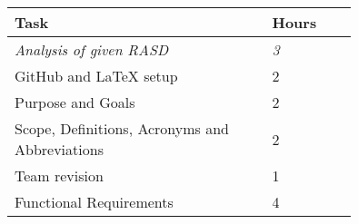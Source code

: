 \smallskip
\begin{center}
\begin{tabular}{ | p{0.75\linewidth} | l | }
  \hline
    \textbf{Task} & \textbf{Hours }\\ \hline
    \textit{Analysis of given RASD} & \textit{3} \\ \hline
    GitHub and LaTeX setup & 2 \\ \hline
    Purpose and Goals & 2 \\ \hline
    Scope, Definitions, Acronyms and Abbreviations & 2 \\ \hline
    Team revision & 1 \\ \hline
    Functional Requirements & 4 \\ \hline
\end{tabular}
\end{center}

\clearpage
